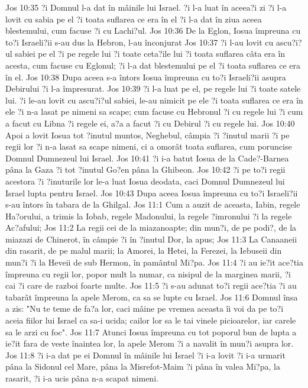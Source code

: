 Jos 10:35  ?i Domnul l-a dat în mâinile lui Israel. ?i l-a luat în aceea?i zi ?i l-a lovit cu sabia pe el ?i toata suflarea ce era în el ?i l-a dat în ziua aceea blestemului, cum facuse ?i cu Lachi?ul.
Jos 10:36  De la Eglon, Iosua împreuna cu to?i Israeli?ii s-au dus la Hebron, l-au înconjurat
Jos 10:37  ?i l-au lovit cu ascu?i?ul sabiei pe el ?i pe regele lui ?i toate ceta?ile lui ?i toata suflarea câta era în acesta, cum facuse cu Eglonul; ?i l-a dat blestemului pe el ?i toata suflarea ce era în el.
Jos 10:38  Dupa aceea s-a întors Iosua împreuna cu to?i Israeli?ii asupra Debirului ?i l-a împresurat.
Jos 10:39  ?i l-a luat pe el, pe regele lui ?i toate satele lui. ?i le-au lovit cu ascu?i?ul sabiei, le-au nimicit pe ele ?i toata suflarea ce era în ele ?i n-a lasat pe nimeni sa scape; cum facuse cu Hebronul ?i cu regele lui ?i cum a facut cu Libna ?i regele ei, a?a a facut ?i cu Debirul ?i cu regele lui.
Jos 10:40  Apoi a lovit Iosua tot ?inutul muntos, Neghebul, câmpia ?i ?inutul marii ?i pe regii lor ?i n-a lasat sa scape nimeni, ci a omorât toata suflarea, cum poruncise Domnul Dumnezeul lui Israel.
Jos 10:41  ?i i-a batut Iosua de la Cade?-Barnea pâna la Gaza ?i tot ?inutul Go?en pâna la Ghibeon.
Jos 10:42  ?i pe to?i regii acestora ?i ?inuturile lor le-a luat Iosua deodata, caci Domnul Dumnezeul lui Israel lupta pentru Israel.
Jos 10:43  Dupa aceea Iosua împreuna cu to?i Israeli?ii s-au întors în tabara de la Ghilgal.
Jos 11:1  Cum a auzit de aceasta, Iabin, regele Ha?orului, a trimis la Iobab, regele Madonului, la regele ?imronului ?i la regele Ac?afului;
Jos 11:2  La regii cei de la miazanoapte; din mun?i, de pe podi?, de la miazazi de Chinerot, în câmpie ?i în ?inutul Dor, la apus;
Jos 11:3  La Canaaneii din rasarit, de pe malul marii; la Amorei, la Hetei, la Ferezei, la Iebuseii din mun?i ?i la Heveii de sub Hermon, în pamântul Mi?pa.
Jos 11:4  ?i au ie?it ace?tia împreuna cu regii lor, popor mult la numar, ca nisipul de la marginea marii, ?i cai ?i care de razboi foarte multe.
Jos 11:5  ?i s-au adunat to?i regii ace?tia ?i au tabarât împreuna la apele Merom, ca sa se lupte cu Israel.
Jos 11:6  Domnul însa a zis: "Nu te teme de fa?a lor, caci mâine pe vremea aceasta îi voi da pe to?i aceia fiilor lui Israel ca sa-i ucida; cailor lor sa le tai vinele picioarelor, iar carele sa le arzi cu foc".
Jos 11:7  Atunci Iosua împreuna cu tot poporul bun de lupta a ie?it fara de veste înaintea lor, la apele Merom ?i a navalit în mun?i asupra lor.
Jos 11:8  ?i i-a dat pe ei Domnul în mâinile lui Israel ?i i-a lovit ?i i-a urmarit pâna la Sidonul cel Mare, pâna la Misrefot-Maim ?i pâna în valea Mi?pa, la rasarit, ?i i-a ucis pâna n-a scapat nimeni.
